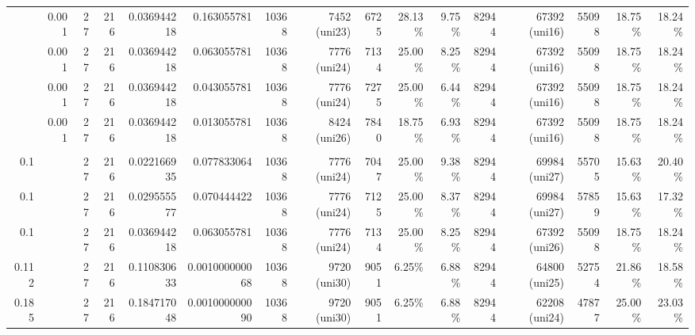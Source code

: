 \begin{landscape}
\begin{table}[p]
\begin{tabular}{rrrrrrrrrrrrrrrr}
		\color{red}{0.20} & 0.001 & 27 & 216 & 0.036944218 & 0.163055781 & 10368 & 7452 (uni23) & 6725 & 28.13\% & 9.75\% & 82944 & 67392 (uni16) & 55098 & 18.75\% & 18.24\% \\
		
		\color{red}{0.10} & 0.001 & 27 & 216 & 0.036944218 & 0.063055781 & 10368 & 7776 (uni24) & 7134 & 25.00\% & 8.25\% & 82944 & 67392 (uni16) & 55098 & 18.75\% & 18.24\% \\
		
		\color{red}{0.08} & 0.001 & 27 & 216 & 0.036944218 & 0.043055781 & 10368 & 7776 (uni24) & 7275 & 25.00\% & 6.44\% & 82944 & 67392 (uni16) & 55098 & 18.75\% & 18.24\% \\
		
		\color{red}{0.05} & 0.001 & 27 & 216 & 0.036944218 & 0.013055781 & 10368 & 8424 (uni26) & 7840 & 18.75\% & 6.93\% & 82944 & 67392 (uni16) & 55098 & 18.75\% & 18.24\% \\\\
		
		
		0.1 & \color{red}{0.0006} & 27 & 216 & 0.022166935 & 0.077833064 & 10368 & 7776 (uni24) & 7047 & 25.00\% & 9.38\% & 82944 & 69984 (uni27) & 55705 & 15.63\% & 20.40\% \\
		
		0.1 & \color{red}{0.0008} & 27 & 216 & 0.029555577 & 0.070444422 & 10368 & 7776 (uni24) & 7125 & 25.00\% & 8.37\% & 82944 & 69984 (uni27) & 57859 & 15.63\% & 17.32\% \\
		
		0.1 & \color{red}{0.0010} & 27 & 216 & 0.036944218 & 0.063055781 & 10368 & 7776 (uni24) & 7134 & 25.00\% & 8.25\% & 82944 & 67392 (uni26) & 55098 & 18.75\% & 18.24\% \\
		
		0.112 & \color{red}{0.0030} & 27 & 216 & 0.110830633 & 0.001000000068 & 10368 &  9720 (uni30) & 9051 & 6.25\% & 6.88\% & 82944 & 64800 (uni25) & 52754 & 21.86\% & 18.58\% \\
		
		0.185 &\color{red}{0.0050} & 27 & 216 & 0.184717048 & 0.001000000090 & 10368 & 9720 (uni30) & 9051 & 6.25\% & 6.88\% & 82944 & 62208 (uni24) & 47877 & 25.00\%& 23.03\% \\
		

\end{tabular}
\end{table}
\end{landscape}

